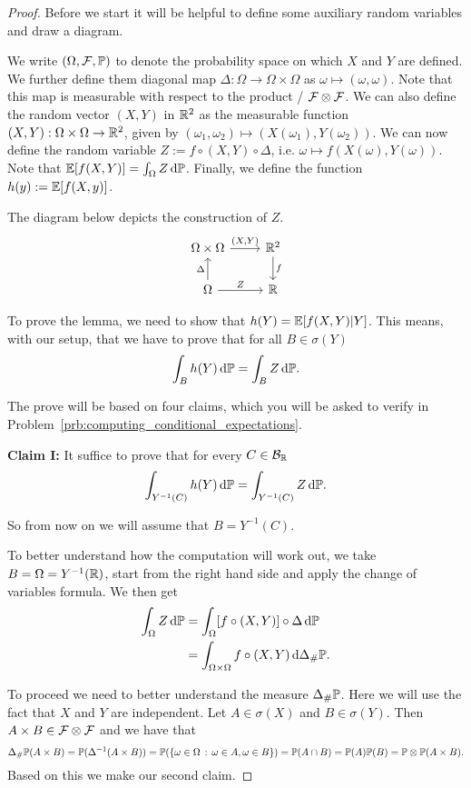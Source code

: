 \begin{proof}
Before we start it will be helpful to define some auxiliary random variables and draw a diagram.

We write $(\Omega, \mathcal F, \mathbb P)$ to denote the probability space on which $X$ and $Y$ are defined. We further define them diagonal map $\Delta : \Omega \to \Omega \times \Omega$ as $\omega \mapsto (\omega, \omega)$. Note that this map is measurable with respect to the product \sigalg/ $\mathcal F \otimes \mathcal F$. We can also define the random vector $(X,Y)$ in $\mathbb R^2$ as the measurable function $(X, Y) : \Omega \times \Omega \to \mathbb R^2$, given by $(\omega_1, \omega_2) \mapsto (X(\omega_1), Y(\omega_2))$. We can now define the random variable $Z := f \circ (X, Y) \circ \Delta$, i.e. $\omega \mapsto f(X(\omega), Y(\omega))$. Note that $\mathbb E[f(X,Y)] = \int_\Omega Z \, \mathrm{d} \mathbb P$. Finally, we define the function $h(y) := \mathbb E[f(X,y)]$.

The diagram below depicts the construction of $Z$.
\[
\begin{tikzcd}
	\Omega \times \Omega \arrow[r,"{(X,Y)}"] &\bbR^2 \arrow[d,"f"]  \\
	\Omega \arrow[u, "\Delta"] \arrow[r, "Z"] &\bbR
\end{tikzcd}
\]

To prove the lemma, we need to show that $h(Y) = \mathbb E[f(X,Y)|Y]$. This means, with our setup, that we have to prove that for all $B \in \sigma(Y)$ 
\[
	\int_B h(Y) \, \mathrm{d} \mathbb P = \int_B Z \, \mathrm{d} \mathbb P.
\]

The prove will be based on four claims, which you will be asked to verify in Problem~\ref{prb:computing_conditional_expectations}.

\textbf{Claim I:} It suffice to prove that for every $C \in \mathcal B_{\mathbb R}$
\[
	\int_{Y^{-1}(C)} h(Y) \, \mathrm{d} \mathbb P = \int_{Y^{-1}(C)} Z \, \mathrm{d} \mathbb P.
\]

So from now on we will assume that $B = Y^{-1}(C)$.

To better understand how the computation will work out, we take $B = \Omega = Y^{-1}(\mathbb R)$, start from the right hand side and apply the change of variables formula. We then get
\begin{align*}
	\int_\Omega Z \, \mathrm{d} \mathbb P &= \int_\Omega [f \circ (X, Y)] \circ \Delta \, \mathrm{d} \mathbb P \\
	&= \int_{\Omega \times \Omega} f \circ (X,Y) \, \mathrm{d} \Delta_\# \mathbb P.
\end{align*}

To proceed we need to better understand the measure $\Delta_\# \mathbb P$. Here we will use the fact that $X$ and $Y$ are independent. Let $A \in \sigma(X)$ and $B \in \sigma(Y)$. Then $A \times B \in \mathcal F \otimes \mathcal F$ and we have that
\[
	\Delta_\# \mathbb P(A \times B) = \mathbb P(\Delta^{-1}(A \times B))
	= \mathbb P(\{\omega \in \Omega \, : \, \omega \in A, \omega \in B\})
	= \mathbb P(A \cap B) = \mathbb P(A) \mathbb P(B) = \mathbb P\otimes \mathbb P(A\times B).
\]
Based on this we make our second claim.


\end{proof}

